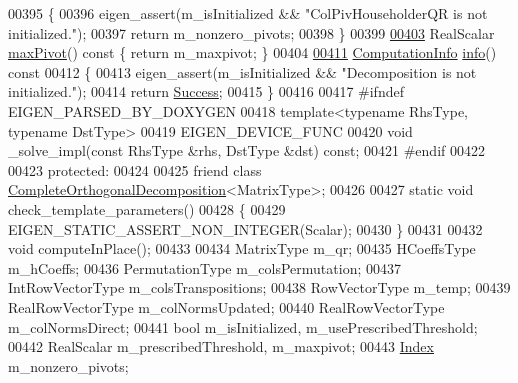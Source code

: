 \begin{DoxyCode}
00395 \textcolor{keyword}{    }\{
00396       eigen\_assert(m\_isInitialized && \textcolor{stringliteral}{"ColPivHouseholderQR is not initialized."});
00397       \textcolor{keywordflow}{return} m\_nonzero\_pivots;
00398     \}
00399 
\hyperlink{group___q_r___module_aac8c43d720170980f582d01494df9e8f}{00403}     RealScalar \hyperlink{group___q_r___module_aac8c43d720170980f582d01494df9e8f}{maxPivot}()\textcolor{keyword}{ const }\{ \textcolor{keywordflow}{return} m\_maxpivot; \}
00404 
\hyperlink{group___q_r___module_a5c756a789175197cab3eff3a3e479ef2}{00411}     \hyperlink{group__enums_ga85fad7b87587764e5cf6b513a9e0ee5e}{ComputationInfo} \hyperlink{group___q_r___module_a5c756a789175197cab3eff3a3e479ef2}{info}()\textcolor{keyword}{ const}
00412 \textcolor{keyword}{    }\{
00413       eigen\_assert(m\_isInitialized && \textcolor{stringliteral}{"Decomposition is not initialized."});
00414       \textcolor{keywordflow}{return} \hyperlink{group__enums_gga85fad7b87587764e5cf6b513a9e0ee5ea52581b035f4b59c203b8ff999ef5fcea}{Success};
00415     \}
00416 
00417 \textcolor{preprocessor}{    #ifndef EIGEN\_PARSED\_BY\_DOXYGEN}
00418     \textcolor{keyword}{template}<\textcolor{keyword}{typename} RhsType, \textcolor{keyword}{typename} DstType>
00419     EIGEN\_DEVICE\_FUNC
00420     \textcolor{keywordtype}{void} \_solve\_impl(\textcolor{keyword}{const} RhsType &rhs, DstType &dst) \textcolor{keyword}{const};
00421 \textcolor{preprocessor}{    #endif}
00422 
00423   \textcolor{keyword}{protected}:
00424 
00425     \textcolor{keyword}{friend} \textcolor{keyword}{class }\hyperlink{group___q_r___module_class_eigen_1_1_complete_orthogonal_decomposition}{CompleteOrthogonalDecomposition}<MatrixType>;
00426 
00427     \textcolor{keyword}{static} \textcolor{keywordtype}{void} check\_template\_parameters()
00428     \{
00429       EIGEN\_STATIC\_ASSERT\_NON\_INTEGER(Scalar);
00430     \}
00431 
00432     \textcolor{keywordtype}{void} computeInPlace();
00433 
00434     MatrixType m\_qr;
00435     HCoeffsType m\_hCoeffs;
00436     PermutationType m\_colsPermutation;
00437     IntRowVectorType m\_colsTranspositions;
00438     RowVectorType m\_temp;
00439     RealRowVectorType m\_colNormsUpdated;
00440     RealRowVectorType m\_colNormsDirect;
00441     \textcolor{keywordtype}{bool} m\_isInitialized, m\_usePrescribedThreshold;
00442     RealScalar m\_prescribedThreshold, m\_maxpivot;
00443     \hyperlink{namespace_eigen_a62e77e0933482dafde8fe197d9a2cfde}{Index} m\_nonzero\_pivots;

\end{DoxyCode}
